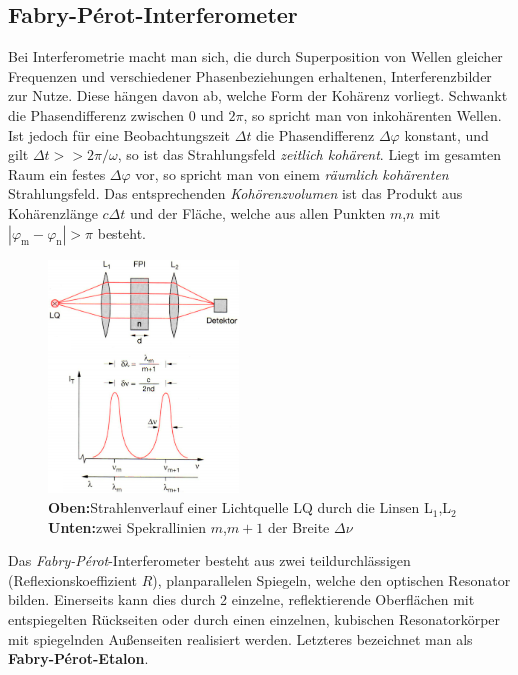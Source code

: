 \documentclass[numbers=noenddot,12pt,a4paper]{scrartcl}
\newcommand{\ix}[1]{_\text{#1}}
\newcommand{\tilt}[1]{\textit{#1}}
\newcommand{\fett}[1]{\textbf{#1}}
\begin{document}
\subsection{Fabry-Pérot-Interferometer}\label{subsec:fpi}
Bei Interferometrie macht man sich, die durch Superposition von Wellen gleicher Frequenzen und verschiedener Phasenbeziehungen erhaltenen, Interferenzbilder zur Nutze. Diese hängen davon ab, welche Form der Kohärenz vorliegt. Schwankt die Phasendifferenz  zwischen $0$ und $2\pi$, so spricht man von inkohärenten Wellen. Ist jedoch für eine Beobachtungszeit $\Delta t$ die Phasendifferenz $\Delta \varphi$ konstant, und gilt $\Delta t>>2\pi/\omega$, so ist das Strahlungsfeld \tilt{zeitlich kohärent}. Liegt im gesamten Raum ein festes $\Delta \varphi$ vor, so spricht man von einem \tilt{räumlich kohärenten} Strahlungsfeld. Das entsprechenden \tilt{Kohörenzvolumen} ist das Produkt aus Kohärenzlänge $c\Delta t$ und der Fläche, welche aus allen Punkten $m$,$n$ mit $|\varphi\ix{m}-\varphi\ix{n}|>\pi$ besteht.
\newpage
\begin{figure}
	\centering
	\vspace{-0.75cm}
	\includegraphics[width=0.45\textwidth]{fpi.png}
	\caption{
		\fett{Oben:}Strahlenverlauf einer Lichtquelle LQ durch die Linsen L$\ix{1}$,L$\ix{2}$\\
		\fett{Unten:}zwei Spekrallinien $m$,$m+1$ der Breite $\Delta \nu$}
\end{figure}
Das \tilt{Fabry-Pérot}-Interferometer besteht aus zwei teildurchlässigen (Reflexionskoeffizient $R$), planparallelen Spiegeln, welche den optischen Resonator bilden. Einerseits kann dies durch 2 einzelne, reflektierende Oberflächen mit entspiegelten Rückseiten oder durch einen einzelnen, kubischen Resonatorkörper mit spiegelnden Außenseiten realisiert werden. Letzteres bezeichnet man als \fett{Fabry-Pérot-Etalon}.\\
\end{document}
